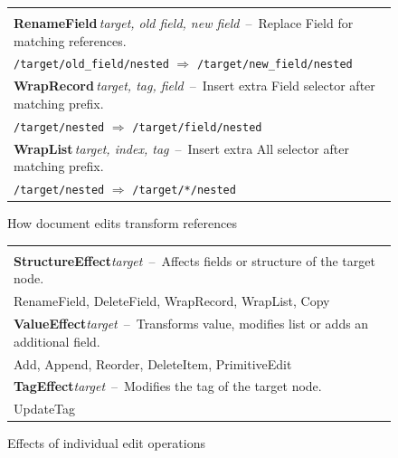 \documentclass[sigconf]{acmart}
\newcommand{\ident}[1]{{\sffamily #1}}
\begin{document}

\begin{figure}
\newcommand{\tttablecol}[5]{
\small{\bfseries #1}\;\,\footnotesize\textit{#2}\,\; --\,\; #5\\[-0.1em]
\quad \footnotesize #3 \;\;$\Rightarrow$\;\; #4 \\[0.3em]
}
\begin{tabular}{|p{27em}|}
\hline
\\[-1em]
\tttablecol{RenameField}{target, old field, new field}{\texttt{/target/old\_field/nested}}{\texttt{/target/new\_field/nested}}
  {Replace Field for matching references.}
\tttablecol{WrapRecord}{target, tag, field}{\texttt{/target/nested}}{\texttt{/target/field/nested}}
  {Insert extra Field selector after matching prefix.}
\tttablecol{WrapList}{target, index, tag}{\texttt{/target/nested}}{\texttt{/target/*/nested}}
  {Insert extra All selector after matching prefix.}
\hline
\end{tabular}
\vspace{-0.75em}
\caption{How document edits transform references}
\label{fig:updates}
\vspace{-0.5em}
\end{figure}


\begin{figure}
\newcommand{\eftablecol}[3]{
\small{\bfseries #1}\;\footnotesize\textit{target}\,\; --\,\; {\footnotesize #2}\\[-0.1em]
\quad \small #3\\[0.3em]
}
\begin{tabular}{|p{27em}|}
\hline
\\[-1em]
\eftablecol{StructureEffect}{Affects fields or structure of the target node.}
  {\ident{RenameField}, \ident{DeleteField}, \ident{WrapRecord}, \ident{WrapList}, \ident{Copy}}
\eftablecol{ValueEffect}{Transforms value, modifies list or adds an additional field.}
  {\ident{Add}, \ident{Append}, \ident{Reorder}, \ident{DeleteItem}, \ident{PrimitiveEdit}}
\eftablecol{TagEffect}{Modifies the tag of the target node.}
  {\ident{UpdateTag}}
\hline
\end{tabular}
\vspace{-0.75em}
\caption{Effects of individual edit operations}
\label{fig:effects}
\vspace{-1em}
\end{figure}
\end{document}
